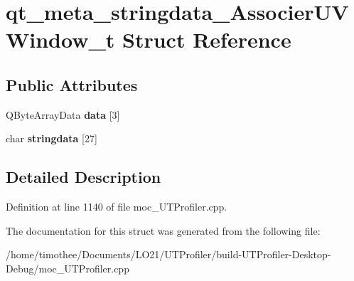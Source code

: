 \hypertarget{structqt__meta__stringdata___associer_u_v_window__t}{\section{qt\-\_\-meta\-\_\-stringdata\-\_\-\-Associer\-U\-V\-Window\-\_\-t Struct Reference}
\label{structqt__meta__stringdata___associer_u_v_window__t}
}
\subsection*{Public Attributes}
\begin{DoxyCompactItemize}
\item 
\hypertarget{structqt__meta__stringdata___associer_u_v_window__t_adca27a5b25bcca9aad8a23c5d2f706a4}{Q\-Byte\-Array\-Data {\bfseries data} \mbox{[}3\mbox{]}}\label{structqt__meta__stringdata___associer_u_v_window__t_adca27a5b25bcca9aad8a23c5d2f706a4}

\item 
\hypertarget{structqt__meta__stringdata___associer_u_v_window__t_acb0d547f52eb5781c45566800e53f5aa}{char {\bfseries stringdata} \mbox{[}27\mbox{]}}\label{structqt__meta__stringdata___associer_u_v_window__t_acb0d547f52eb5781c45566800e53f5aa}

\end{DoxyCompactItemize}


\subsection{Detailed Description}


Definition at line 1140 of file moc\-\_\-\-U\-T\-Profiler.\-cpp.



The documentation for this struct was generated from the following file\-:\begin{DoxyCompactItemize}
\item 
/home/timothee/\-Documents/\-L\-O21/\-U\-T\-Profiler/build-\/\-U\-T\-Profiler-\/\-Desktop-\/\-Debug/moc\-\_\-\-U\-T\-Profiler.\-cpp\end{DoxyCompactItemize}
